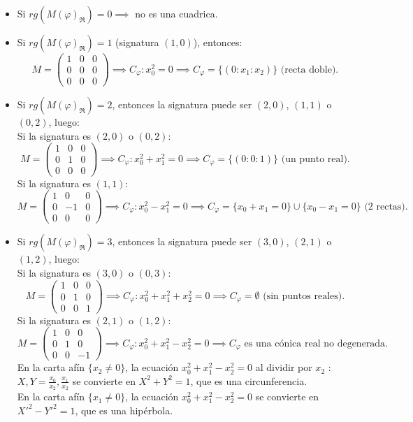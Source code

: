 \begin{itemize}
    \item Si $rg(M(\varphi)_{\mathfrak{R}}) = 0 \implies$ no es una cuadrica.
    \item Si $rg(M(\varphi)_{\mathfrak{R}}) = 1$ (signatura $(1,0)$), entonces:
    \[
        M = \begin{pmatrix}
            1 & 0 & 0 \\
            0 & 0 & 0 \\
            0 & 0 & 0
        \end{pmatrix} \implies C_\varphi : x_0^2 = 0 \implies C_\varphi = \{ (0 : x_1 : x_2) \} \text{ (recta doble).}
    \]
    \item Si $rg(M(\varphi)_{\mathfrak{R}}) = 2$, entonces la signatura puede ser $(2,0)$, $(1,1)$ o $(0,2)$, luego:\\
    Si la signatura es $(2,0)$ o $(0,2)$:
    \[
        M = \begin{pmatrix}
            1 & 0 & 0 \\
            0 & 1 & 0 \\
            0 & 0 & 0
        \end{pmatrix} \implies C_\varphi : x_0^2 + x_1^2 = 0 \implies C_\varphi = \{(0:0:1)\} \text{ (un punto real).}
    \]
    Si la signatura es $(1,1)$:
    \[
        M = \begin{pmatrix}
            1 & 0 & 0 \\
            0 & -1 & 0 \\
            0 & 0 & 0
        \end{pmatrix} \implies C_\varphi : x_0^2 - x_1^2 = 0 \implies C_\varphi = \{ x_0 + x_1 = 0 \} \cup \{ x_0 - x_1 = 0 \} \text{ (2 rectas).}
    \]    
    \item Si $rg(M(\varphi)_{\mathfrak{R}}) = 3$, entonces la signatura puede ser $(3,0)$, $(2,1)$ o $(1,2)$, luego:\\
    Si la signatura es $(3,0)$ o $(0,3)$:
    \[
        M = \begin{pmatrix}
            1 & 0 & 0 \\
            0 & 1 & 0 \\
            0 & 0 & 1
        \end{pmatrix} \implies C_\varphi : x_0^2 + x_1^2 + x_2^2 = 0 \implies C_\varphi = \emptyset \text{ (sin puntos reales).}
    \]
    Si la signatura es $(2,1)$ o $(1,2)$:
    \[
        M = \begin{pmatrix}
            1 & 0 & 0 \\
            0 & 1 & 0 \\
            0 & 0 & -1
        \end{pmatrix} \implies C_\varphi : x_0^2 + x_1^2 - x_2^2 = 0 \implies C_\varphi \text{ es una cónica real no degenerada.}
    \]
    En la carta afín $\{x_2 \neq 0\}$, la ecuación $x_0^2 + x_1^2 - x_2^2 = 0$ al dividir por $x_2$ : $X, Y = \frac{x_0}{x_2}, \frac{x_1}{x_2}$ se convierte en $X^2 + Y^2 = 1$, que es una circunferencia.\\
    En la carta afín $\{x_1 \neq 0\}$, la ecuación $x_0^2 + x_1^2 - x_2^2 = 0$ se convierte en $X'^2 - Y'^2 = 1$, que es una hipérbola.\\ 
\end{itemize}

